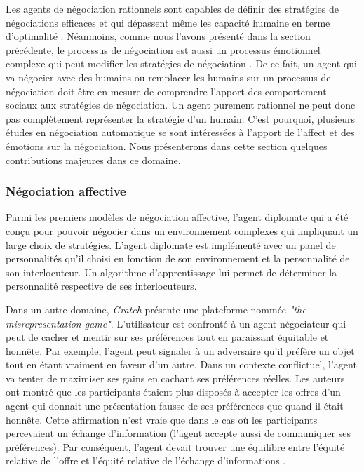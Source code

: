 	 Les agents de négociation rationnels sont capables de définir des stratégies de négociations efficaces et qui dépassent même les capacité humaine en terme d'optimalité \cite{jonker2012negotiating}. Néanmoins, comme nous l'avons présenté dans la section précédente, le processus de négociation est aussi un processus émotionnel complexe qui peut modifier les stratégies de négociation \cite{broekens2010affective}. De ce fait, 
	 un agent qui va négocier avec des humains ou remplacer les humains sur un processus de négociation doit être en mesure de comprendre l'apport des comportement sociaux aux stratégies de négociation. Un agent purement rationnel ne peut donc pas complètement représenter la stratégie d'un humain. 
	 C'est pourquoi, plusieurs études en négociation automatique se sont intéressées à l'apport de l'affect et des émotions sur la négociation. Nous présenterons dans cette section quelques contributions majeures dans ce domaine. 
	 
	  \subsubsection{Négociation affective}
	  
	 Parmi les premiers modèles de négociation affective, l'agent diplomate \cite{kraus1995designing} qui a été conçu pour pouvoir négocier dans un environnement complexes qui impliquant un large choix de stratégies. L'agent diplomate est implémenté avec un panel de personnalités qu'il choisi en fonction de son environnement et la personnalité de son interlocuteur.  Un algorithme d'apprentissage lui permet de déterminer la personnalité respective de ses interlocuteurs. 
	 
	 Dans un autre domaine, \emph{Gratch} \cite{gratch2016misrepresentation} présente une plateforme nommée \emph{"the misrepresentation game"}. L'utilisateur est confronté à un agent négociateur qui peut de cacher et mentir sur ses préférences tout en paraissant équitable et honnête. Par exemple, l'agent peut signaler à un adversaire qu'il préfère un objet tout en étant vraiment en faveur d'un autre. Dans un contexte conflictuel, l'agent va tenter de maximiser ses gains en cachant ses préférences réelles. Les auteurs ont montré que les participants étaient plus disposés à accepter les offres d'un agent qui donnait une présentation fausse de ses préférences que quand il était honnête. Cette affirmation n'est vraie que dans le cas où les participants percevaient un échange d'information (l'agent accepte aussi de communiquer ses  préférences). Par conséquent, l'agent devait trouver une équilibre entre l'équité relative de l'offre et l'équité relative de l'échange d'informations \cite{gratch2016misrepresentation}.
	 
